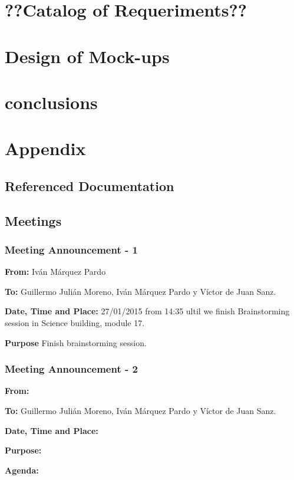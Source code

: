 \documentclass{sgnip}
\begin{document}
\chapter{??Catalog of Requeriments??}

\chapter{Design of Mock-ups}

\chapter{conclusions}

\chapter{Appendix}

\section{Referenced Documentation}
\newpage
\section{Meetings}

\subsection{Meeting Announcement - 1}

\textbf{From: } Iván Márquez Pardo

\textbf{To: } Guillermo Julián Moreno, Iván Márquez Pardo y Víctor de Juan Sanz.

\textbf{Date, Time and Place: } 27/01/2015 from 14:35 ultil we finish Brainstorming session in Science building, module 17.

\textbf{Purpose} Finish brainstorming session.

\subsection{Meeting Announcement - 2}


\textbf{From: }

\textbf{To: } Guillermo Julián Moreno, Iván Márquez Pardo y Víctor de Juan Sanz.


\textbf{Date, Time and Place: } 


\textbf{Purpose: }


\textbf{Agenda: }
\end{document}

